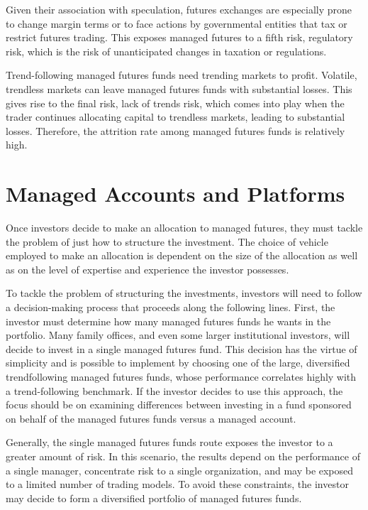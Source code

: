 \documentclass[11pt]{article}
\begin{document}
Given their association with speculation, futures exchanges are especially prone to change margin terms or to face actions by governmental entities that tax or restrict futures trading. This exposes managed futures to a fifth risk, regulatory risk, which is the risk of unanticipated changes in taxation or regulations.

Trend-following managed futures funds need trending markets to profit. Volatile, trendless markets can leave managed futures funds with substantial losses. This gives rise to the final risk, lack of trends risk, which comes into play when the trader continues allocating capital to trendless markets, leading to substantial losses. Therefore, the attrition rate among managed futures funds is relatively high.

\section*{Managed Accounts and Platforms}
Once investors decide to make an allocation to managed futures, they must tackle the problem of just how to structure the investment. The choice of vehicle employed to make an allocation is dependent on the size of the allocation as well as on the level of expertise and experience the investor possesses.

To tackle the problem of structuring the investments, investors will need to follow a decision-making process that proceeds along the following lines. First, the investor must determine how many managed futures funds he wants in the portfolio. Many family offices, and even some larger institutional investors, will decide to invest in a single managed futures fund. This decision has the virtue of simplicity and is possible to implement by choosing one of the large, diversified trendfollowing managed futures funds, whose performance correlates highly with a trend-following benchmark. If the investor decides to use this approach, the focus should be on examining differences between investing in a fund sponsored on behalf of the managed futures funds versus a managed account.

Generally, the single managed futures funds route exposes the investor to a greater amount of risk. In this scenario, the results depend on the performance of a single manager, concentrate risk to a single organization, and may be exposed to a limited number of trading models. To avoid these constraints, the investor may decide to form a diversified portfolio of managed futures funds.
\end{document}
